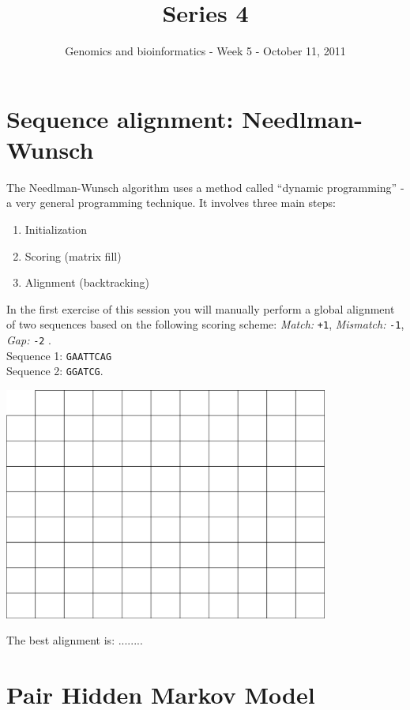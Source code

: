 \documentclass[a4paper,11pt]{article}
\title{Series 4}
\date{}
\author{Genomics and bioinformatics - Week 5 - October 11, 2011}
\begin{document}
\maketitle




\section{Sequence alignment: Needlman-Wunsch}
The Needlman-Wunsch algorithm uses a method called ``dynamic programming'' - a very general programming technique. It involves three main steps:
\begin{enumerate}
\item Initialization
\item Scoring (matrix fill)
\item Alignment (backtracking)
\end{enumerate}
In the first exercise of this session you will manually perform a global alignment of two sequences based on the following scoring scheme:
\emph{Match:} \texttt{+1}, \emph{Mismatch:} \texttt{-1}, \emph{Gap:} \texttt{-2} .\\
Sequence 1: \texttt{GAATTCAG}\\
Sequence 2: \texttt{GGATCG}.
\vspace{0.5cm}
\begin{center}
\includegraphics[width=0.8\textwidth]{matrix.png}
\end{center}
\vspace{0.5cm}

The best alignment is: ........\\

 
\section{Pair Hidden Markov Model}
\end{document}
